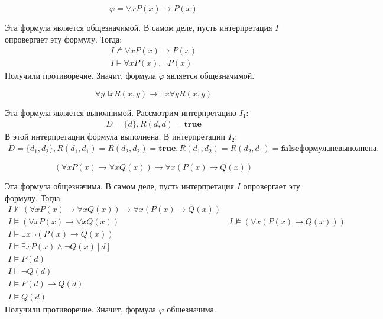 \documentclass[11pt]{article}
\begin{document}
\begin{equation*}
\varphi = \forall x P(x) \to P(x)
\end{equation*}

Эта формула является общезначимой. В самом деле, пусть интерпретация \(I\) опровергает эту формулу. Тогда:
\begin{align*}
I \not\models \forall x P(x) \to P(x) \\
I \models \forall x P(x), \lnot P(x)
\end{align*}
Получили противоречие. Значит, формула $\varphi$ является общезначимой.

\begin{equation*}
\forall y\exists x R(x, y) \to \exists x \forall y R(x, y)
\end{equation*}

Эта формула является выполнимой. Рассмотрим интерпретацию \(I_1\):
\begin{align*}
D = \{d\}, R(d, d) = \textbf{true}
\end{align*}
В этой интерпретации формула выполнена. В интерпретации $I_2$:
\begin{align*}
D = \{d_1, d_2\}, R(d_1, d_1) = R(d_2, d_2) = \textbf{true}, R(d_1, d_2) = R(d_2, d_1) = \textbf{false}
формула не выполнена.
\end{align*}

\begin{equation*}
(\forall x P(x) \to \forall x Q(x)) \to \forall x(P(x) \to Q(x))
\end{equation*}

Эта формула общезначима. В самом деле, пусть интерпретация \(I\) опровергает эту формулу. Тогда:
\begin{align*}
I \not\models (\forall x P(x) \to \forall x Q(x)) \to \forall x(P(x) \to Q(x)) \\
I \models (\forall x P(x) \to \forall x Q(x)) &\, I \not\models (\forall x (P(x) \to Q(x))) \\
I \models \exists x \lnot (P(x) \to Q(x)) \\
I \models \exists x P(x) \land \lnot Q(x) [d] \\
I \models P(d) \\
I \models \lnot Q(d) \\
I \models P(d) \to Q(d) \\
I \models Q(d)
\end{align*}
Получили противоречие. Значит, формула $\varphi$ общезначима.
\end{document}

